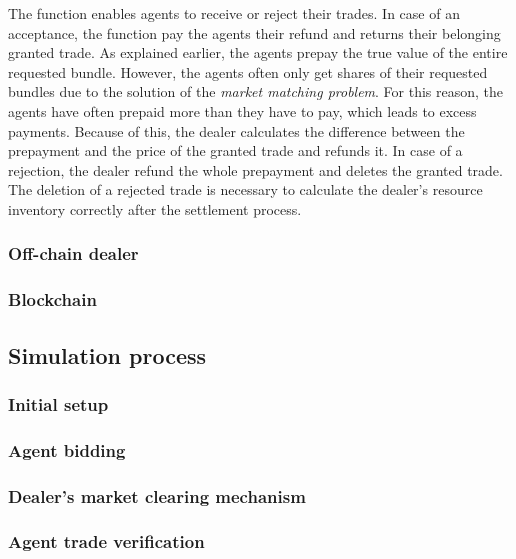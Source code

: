 The function enables agents to receive or reject their trades. 
In case of an acceptance, the function pay the agents their refund
and returns their belonging granted trade.
As explained earlier, the agents prepay the true value of the entire requested bundle.
However, the agents often only get shares of their requested bundles due to the solution of the 
\textit{market matching problem}.
For this reason, the agents have often prepaid more than they have to pay, which leads to 
excess payments. Because of this, the dealer calculates the difference between the prepayment 
and the price of the granted trade and refunds it.
In case of a rejection, the dealer refund the whole prepayment and deletes the granted trade.
The deletion of a rejected trade is necessary to calculate the dealer's resource inventory correctly
after the settlement process.

\begin{comment}

\end{comment}


\subsubsection{Off-chain dealer}

\subsubsection{Blockchain}

\subsection{Simulation process}

\subsubsection{Initial setup}

\subsubsection{Agent bidding}

\subsubsection{Dealer's market clearing mechanism}

\subsubsection{Agent trade verification}
